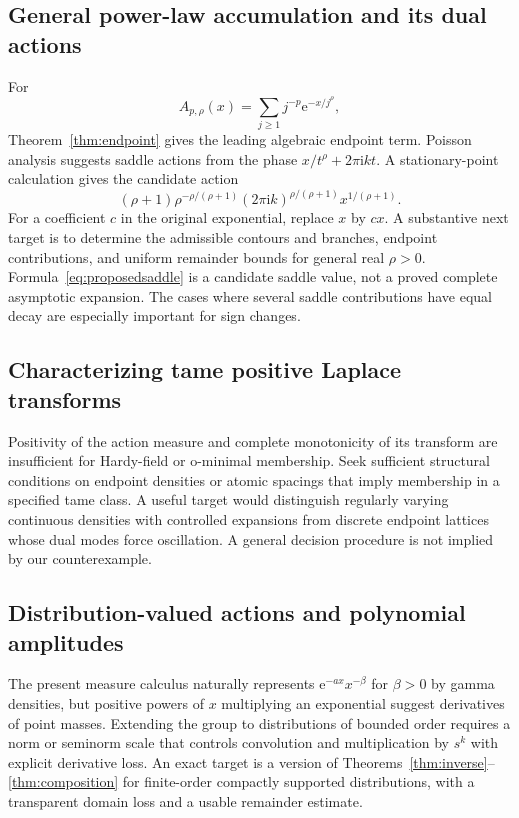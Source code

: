 \documentclass[11pt,a4paper]{article}
\theoremstyle{definition}
\theoremstyle{remark}
\newcommand{\e}{\mathrm e}
\newcommand{\ii}{\mathrm i}
\numberwithin{equation}{section}
\begin{document}
\subsection{General power-law accumulation and its dual actions}
For
\[
 A_{p,\rho}(x)=\sum_{j\ge1}j^{-p}\e^{-x/j^\rho},
\]
Theorem~\ref{thm:endpoint} gives the leading algebraic endpoint term. Poisson analysis suggests saddle actions from the phase $x/t^\rho+2\pi\ii kt$. A stationary-point calculation gives the candidate action
\begin{equation}\label{eq:proposedsaddle}
 (\rho+1)\rho^{-\rho/(\rho+1)}
 (2\pi\ii k)^{\rho/(\rho+1)}x^{1/(\rho+1)}.
\end{equation}
For a coefficient $c$ in the original exponential, replace $x$ by $cx$. A substantive next target is to determine the admissible contours and branches, endpoint contributions, and uniform remainder bounds for general real $\rho>0$. Formula~\eqref{eq:proposedsaddle} is a candidate saddle value, not a proved complete asymptotic expansion. The cases where several saddle contributions have equal decay are especially important for sign changes.

\subsection{Characterizing tame positive Laplace transforms}
Positivity of the action measure and complete monotonicity of its transform are insufficient for Hardy-field or o-minimal membership. Seek sufficient structural conditions on endpoint densities or atomic spacings that imply membership in a specified tame class. A useful target would distinguish regularly varying continuous densities with controlled expansions from discrete endpoint lattices whose dual modes force oscillation. A general decision procedure is not implied by our counterexample.

\subsection{Distribution-valued actions and polynomial amplitudes}
The present measure calculus naturally represents $\e^{-ax}x^{-\beta}$ for $\beta>0$ by gamma densities, but positive powers of $x$ multiplying an exponential suggest derivatives of point masses. Extending the group to distributions of bounded order requires a norm or seminorm scale that controls convolution and multiplication by $s^k$ with explicit derivative loss. An exact target is a version of Theorems~\ref{thm:inverse}--\ref{thm:composition} for finite-order compactly supported distributions, with a transparent domain loss and a usable remainder estimate.
\end{document}
